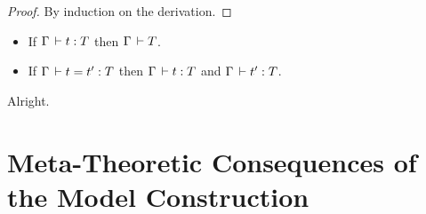 \documentclass[a4paper,english]{lipics-utf8x}
\begin{document}
  \begin{proof}
    By induction on the derivation.
  \end{proof}

  \begin{corollary}
    \leavevmode
    \begin{itemize}
      \item If $\Gamma \,\vdash t : T$ then $\Gamma \,\vdash T$.
      \item If $\Gamma \,\vdash t = t' : T$ then $\Gamma \,\vdash t : T$ and
      $\Gamma \,\vdash t' : T$.
    \end{itemize}
  \end{corollary}
  Alright.

  \section{Meta-Theoretic Consequences of the Model Construction}
\end{document}
